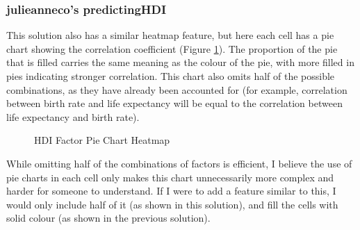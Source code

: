\documentclass[12pt]{report}
\begin{document}
\subsubsection{julieanneco's predictingHDI \cite{existingSol2}}
This solution also has a similar heatmap feature, but here each cell has a pie chart showing the correlation coefficient (Figure \ref{fig:es2a}). The proportion of the pie that is filled carries the same meaning as the colour of the pie, with more filled in pies indicating stronger correlation. This chart also omits half of the possible combinations, as they have already been accounted for (for example, correlation between birth rate and life expectancy will be equal to the correlation between life expectancy and birth rate).
\begin{figure}[H]
\centering
{}
\caption{HDI Factor Pie Chart Heatmap}\label{fig:es2a}
\end{figure}
While omitting half of the combinations of factors is efficient, I believe the use of pie charts in each cell only makes this chart unnecessarily more complex and harder for someone to understand. If I were to add a feature similar to this, I would only include half of it (as shown in this solution), and fill the cells with solid colour (as shown in the previous solution).
\end{document}
